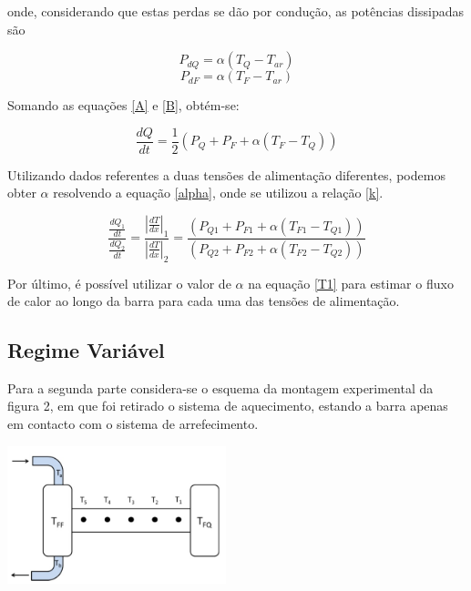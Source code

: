 \documentclass[8pt]{extarticle}
\newcommand{\PC}[1]{\ensuremath{\left(#1\right)}}
\begin{document}
\begin{multicols}{2}
\par\noindent onde, considerando que estas perdas se dão por condução, as potências dissipadas são

\begin{equation}
P_{dQ}=\alpha\PC{T_Q-T_{ar}}
\end{equation}
\begin{equation}
P_{dF}=\alpha\PC{T_F-T_{ar}}
\end{equation}

\par Somando as equações \eqref{A} e \eqref{B}, obtém-se:

\begin{equation} \label{T1}
\frac{dQ}{dt}=\frac{1}{2}\PC{P_Q+P_F+\alpha\PC{T_F-T_Q}}
\end{equation}

\par Utilizando dados referentes a duas tensões de alimentação diferentes, podemos obter $\alpha$ resolvendo a equação \eqref{alpha}, onde se utilizou a relação \eqref{k}.

\begin{equation} \label{alpha}
\frac{\frac{dQ_1}{dt}}{\frac{dQ_2}{dt}}=\frac{|\frac{dT}{dx}|_1}{|\frac{dT}{dx}|_2}=\frac{\PC{P_{Q1}+P_{F1}+\alpha\PC{T_{F1}-T_{Q1}}}}{\PC{P_{Q2}+P_{F2}+\alpha\PC{T_{F2}-T_{Q2}}}}
\end{equation}

\par Por último, é possível utilizar o valor de $\alpha$ na equação \eqref{T1} para estimar o fluxo de calor ao longo da barra para cada uma das tensões de alimentação.

\subsection*{Regime Variável}
Para a segunda parte considera-se o esquema da montagem experimental da figura 2, em que foi retirado o sistema de aquecimento, estando a barra apenas em contacto com o sistema de arrefecimento.

\begin{center}
\includegraphics[width=180pt]{figura2.jpg}
\par{}
\end{center}



\end{multicols}
\end{document}
